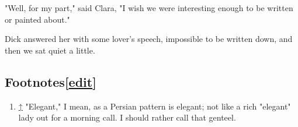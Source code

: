 "Well, for my part," said Clara, "I wish we were interesting enough to
be written or painted about."

Dick answered her with some lover's speech, impossible to be written
down, and then we sat quiet a little.

\hypertarget{footnotesedit}{%
\subsection[{{{[}}\href{/w/index.php?title=News_from_Nowhere/Chapter_XVI\&action=edit\&section=1}{edit}{{]}}}]{\texorpdfstring{\protect\hypertarget{Footnotes}{}{Footnotes}{{{[}}\href{/w/index.php?title=News_from_Nowhere/Chapter_XVI\&action=edit\&section=1}{edit}{{]}}}}{Footnotes{[}edit{]}}}\label{footnotesedit}}

\begin{enumerate}
\tightlist
\item
  \protect\hypertarget{cite_note-1}{}{{\protect\hyperlink{cite_ref-1}{↑}}
  {"Elegant," I mean, as a Persian pattern is elegant; not like a rich
  "elegant" lady out for a morning call. I should rather call that
  genteel.}}
\end{enumerate}
